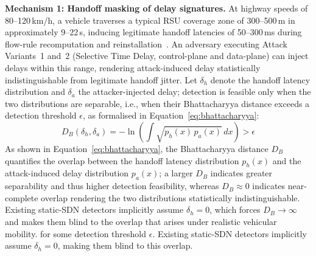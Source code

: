 \documentclass[12pt, a4paper]{report}
\begin{document}
\textbf{Mechanism 1: Handoff masking of delay signatures.}
At highway speeds of 80--120\,km/h, a vehicle traverses a typical
RSU coverage zone of 300--500\,m in approximately 9--22\,s, inducing
legitimate handoff latencies of 50--300\,ms during flow-rule
recomputation and reinstallation~\cite{Islam2021SDVN}. An adversary
executing Attack Variants~1 and~2 (Selective Time Delay,
control-plane and data-plane) can inject delays within this range,
rendering attack-induced delay statistically indistinguishable from
legitimate handoff jitter. Let $\delta_h$ denote the handoff latency
distribution and $\delta_a$ the attacker-injected delay; detection
is feasible only when the two distributions are separable, i.e.,
when their Bhattacharyya distance exceeds a detection threshold
$\epsilon$, as formalised in Equation~\eqref{eq:bhattacharyya}:
\begin{equation}
D_B(\delta_h, \delta_a) = -\ln\left(\int \sqrt{p_h(x)\,p_a(x)}\,dx\right) > \epsilon
\label{eq:bhattacharyya}
\end{equation}
As shown in Equation~\eqref{eq:bhattacharyya}, the
Bhattacharyya distance $D_B$ quantifies the overlap between the
handoff latency distribution $p_h(x)$ and the attack-induced delay
distribution $p_a(x)$; a larger $D_B$ indicates greater separability
and thus higher detection feasibility, whereas $D_B \approx 0$
indicates near-complete overlap rendering the two distributions
statistically indistinguishable. Existing static-SDN detectors
implicitly assume $\delta_h = 0$, which forces $D_B \to \infty$ and
makes them blind to the overlap that arises under realistic vehicular
mobility.
for some detection threshold $\epsilon$. Existing static-SDN detectors
implicitly assume $\delta_h = 0$, making them blind to this overlap.
\end{document}
